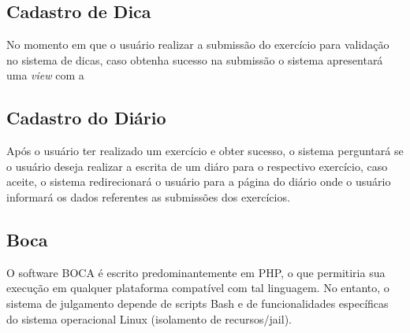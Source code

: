 \subsection{Cadastro de Dica}

No momento em que o usuário realizar a submissão do exercício para validação no sistema de dicas, caso obtenha sucesso na submissão o sistema apresentará uma \textit{view} com a 

\subsection{Cadastro do Diário}

Após o usuário ter realizado um exercício e obter sucesso, o sistema perguntará se o usuário deseja realizar a escrita de um diáro para o respectivo exercício, caso aceite, o sistema redirecionará o usuário para a página do diário onde o usuário informará os dados referentes as submissões dos exercícios.

\subsection{Boca}

O software BOCA é escrito predominantemente em PHP, o que permitiria sua execução em qualquer plataforma compatível com tal linguagem. No entanto, o sistema de julgamento depende de scripts Bash e de funcionalidades específicas do sistema operacional Linux (isolamento de recursos/jail). 


